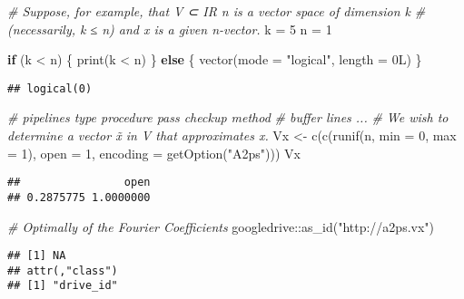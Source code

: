 \documentclass[
]{article}
\newenvironment{Shaded}{\begin{snugshade}}{\end{snugshade}}
\newcommand{\AttributeTok}[1]{\textcolor[rgb]{0.77,0.63,0.00}{#1}}
\newcommand{\CommentTok}[1]{\textcolor[rgb]{0.56,0.35,0.01}{\textit{#1}}}
\newcommand{\ControlFlowTok}[1]{\textcolor[rgb]{0.13,0.29,0.53}{\textbf{#1}}}
\newcommand{\DecValTok}[1]{\textcolor[rgb]{0.00,0.00,0.81}{#1}}
\newcommand{\FunctionTok}[1]{\textcolor[rgb]{0.00,0.00,0.00}{#1}}
\newcommand{\NormalTok}[1]{#1}
\newcommand{\OtherTok}[1]{\textcolor[rgb]{0.56,0.35,0.01}{#1}}
\newcommand{\SpecialCharTok}[1]{\textcolor[rgb]{0.00,0.00,0.00}{#1}}
\newcommand{\StringTok}[1]{\textcolor[rgb]{0.31,0.60,0.02}{#1}}
\begin{document}
\begin{Shaded}
\begin{Highlighting}[]
\CommentTok{\# Suppose, for example, that V ⊂ IR n is a vector space of dimension k }
\CommentTok{\# (necessarily, k ≤ n) and x is a given n{-}vector.}
\NormalTok{k }\OtherTok{=} \DecValTok{5}
\NormalTok{n }\OtherTok{=} \DecValTok{1}

\ControlFlowTok{if}\NormalTok{ (k }\SpecialCharTok{\textless{}}\NormalTok{ n) \{}
    \FunctionTok{print}\NormalTok{(k }\SpecialCharTok{\textless{}}\NormalTok{ n)}
\NormalTok{\} }\ControlFlowTok{else}\NormalTok{ \{}
  \FunctionTok{vector}\NormalTok{(}\AttributeTok{mode =} \StringTok{"logical"}\NormalTok{, }\AttributeTok{length =}\NormalTok{ 0L)}
\NormalTok{\}}
\end{Highlighting}
\end{Shaded}

\begin{verbatim}
## logical(0)
\end{verbatim}

\begin{Shaded}
\begin{Highlighting}[]
\CommentTok{\# pipelines type procedure pass checkup method}
\CommentTok{\# buffer lines ...}
\CommentTok{\# We wish to determine a vector x̃ in V that approximates x.}
\NormalTok{Vx }\OtherTok{\textless{}{-}} \FunctionTok{c}\NormalTok{(}\FunctionTok{c}\NormalTok{(}\FunctionTok{runif}\NormalTok{(n, }\AttributeTok{min =} \DecValTok{0}\NormalTok{, }\AttributeTok{max =} \DecValTok{1}\NormalTok{), }\AttributeTok{open =} \DecValTok{1}\NormalTok{, }
             \AttributeTok{encoding =} \FunctionTok{getOption}\NormalTok{(}\StringTok{"A2ps"}\NormalTok{)))}
\NormalTok{Vx}
\end{Highlighting}
\end{Shaded}

\begin{verbatim}
##                open 
## 0.2875775 1.0000000
\end{verbatim}

\begin{Shaded}
\begin{Highlighting}[]
\CommentTok{\# Optimally of the Fourier Coefficients}
\NormalTok{googledrive}\SpecialCharTok{::}\FunctionTok{as\_id}\NormalTok{(}\StringTok{"http://a2ps.vx"}\NormalTok{)}
\end{Highlighting}
\end{Shaded}

\begin{verbatim}
## [1] NA
## attr(,"class")
## [1] "drive_id"
\end{verbatim}
\end{document}
